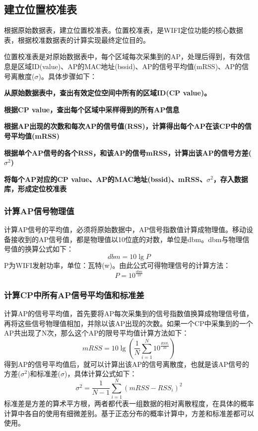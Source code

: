 \documentclass[UTF8, twocolumn ]{ctexart}
\begin{document}
\subsection{建立位置校准表}
根据原始数据表，建立位置校准表。位置校准表，是WIFI定位功能的核心数据表，根据校准数据表的计算实现最终定位目的。
\par
位置校准表是对原始数据表中，每个区域每次采集到的AP，处理后得到，有效信息是区域ID(value)、AP的MAC地址(bssid)、AP的信号平均值(mRSS)、AP的信号离散度($\sigma$)。具体步骤如下：
\begin{compactitem}
\item\textbf{从原始数据表中，查出有效定位空间中所有的区域ID(CP value)。}
\item\textbf{根据CP value，查出每个区域中采样得到的所有AP信息}
\item\textbf{根据AP出现的次数和每次AP的信号值(RSS)，计算得出每个AP在该CP中的信号平均值(mRSS)}
\item\textbf{根据单个AP信号的各个RSS，和该AP的信号mRSS，计算出该AP的信号方差($\sigma^{2}$)}
\item\textbf{将每个AP对应的CP value、AP的MAC地址(bssid)、mRSS、$\sigma^{2}$，存入数据库，形成定位校准表}
\end{compactitem}

\subsubsection{计算AP信号物理值}
计算AP信号的平均值，必须将原始数据中，AP信号指数值计算成物理值。移动设备接收到的AP信号值，都是物理值以10位底的对数，单位是dbm。dbm与物理信号值的换算公式如下：
\begin{equation}
  dbm=10\lg{P}
\end{equation}
P为WIFI发射功率，单位：瓦特(w)。由此公式可得物理信号的计算方法：
\begin{equation}
  P=10^{\frac{dbm}{10}}
\end{equation}

\subsubsection{计算CP中所有AP信号平均值和标准差}
计算AP的信号平均值，首先要将AP每次采集到的信号指数值换算成物理信号值，再将这些信号物理值相加，并除以该AP出现的次数。如果一个CP中采集到的一个AP共出现了N次，那么这个AP的限号平均值计算方法如下：
\begin{equation}
  mRSS=10\lg\left(\frac{1}{N}\sum^{N}_{i=1}10^{\frac{RSS_{i}}{10}}\right)
\end{equation}
得到AP的信号平均值后，就可以计算出该AP的信号离散度，也就是该AP信号的方差($\sigma^{2}$)和标准差($\sigma$)，具体计算公式如下：
\begin{equation}
  \sigma^{2}=\frac{1}{N-1}\sum^{N}_{i=1}\left(mRSS-RSS_{i}\right)^{2}
\end{equation}
标准差是方差的算术平方根，两者都代表一组数据的相对离散程度，在具体的概率计算中各自的使用有细微差别。基于正态分布的概率计算中，方差和标准差都可以使用。
\end{document}
